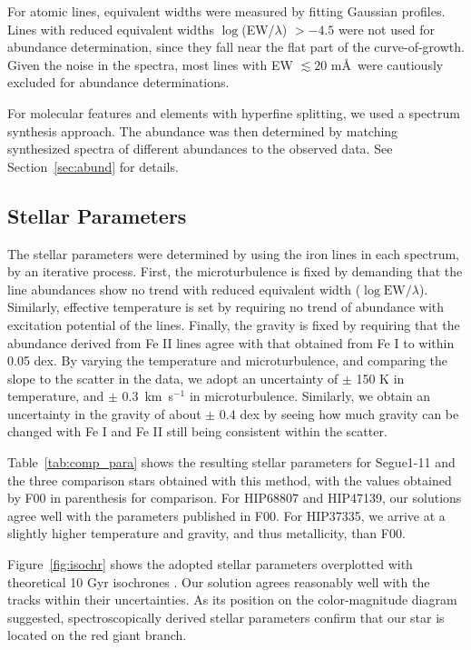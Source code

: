 \documentclass[manuscript]{aastex}
\begin{document}
For atomic lines, equivalent widths were measured by fitting Gaussian profiles. Lines with reduced equivalent widths $\log$(EW/$\lambda$) $> -4.5$ were not used for abundance determination, since they fall near the flat part of the curve-of-growth. Given the noise in the spectra, most lines with EW $\lesssim 20$ m\AA\,  were cautiously excluded for abundance determinations.

For molecular features and elements with hyperfine splitting, we used a spectrum synthesis approach. The abundance was then determined by matching synthesized spectra of different abundances to the observed data. See Section~\ref{sec:abund} for details.


\subsection{Stellar Parameters}
\label{sec:stpar}
The stellar parameters were determined by using the iron lines in each spectrum, by an iterative process. First, the microturbulence is fixed by demanding that the line abundances show no trend with reduced equivalent width ($\log \mbox{EW}/\lambda$). Similarly, effective temperature is set by requiring no trend of abundance with excitation potential of the lines. Finally, the gravity is fixed by requiring that the abundance derived from Fe II lines agree with that obtained from Fe I to within 0.05 dex. By varying the temperature and microturbulence, and comparing the slope to the scatter in the data, we adopt an uncertainty of $\pm$ 150 K in temperature, and $\pm$ 0.3~km~s$^{-1}$ in microturbulence. Similarly, we obtain an uncertainty in the gravity of about $\pm$ 0.4 dex by seeing how much gravity can be changed with Fe I and Fe II still being consistent within the scatter.


Table~\ref{tab:comp_para} shows the resulting stellar parameters for Segue1-11 and the three comparison stars obtained with this method, with the values obtained by F00 in parenthesis for comparison. For HIP68807 and HIP47139, our solutions agree well with the parameters published in F00. For HIP37335, we arrive at a slightly higher temperature and gravity, and thus metallicity, than F00.


Figure~\ref{fig:isochr} shows the adopted stellar parameters overplotted with theoretical 10 Gyr isochrones \citep{Kim2002}. Our solution agrees reasonably well with the tracks within their uncertainties. As its position on the color-magnitude diagram suggested, spectroscopically derived stellar parameters confirm that our star is located on the red giant branch.
\end{document}
